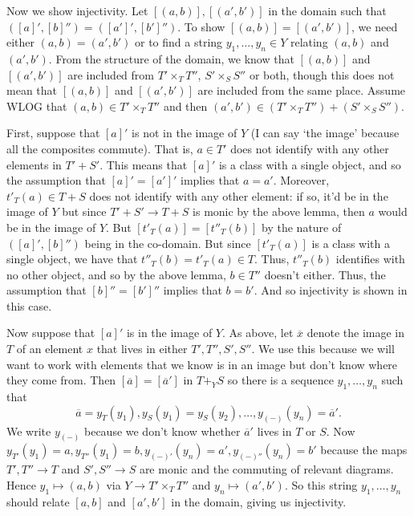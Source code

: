 \documentclass[12pt]{article}
\renewcommand{\(}{\left(}
\renewcommand{\)}{\right)}
\renewcommand{\{}{\left\lbrace}
\renewcommand{\}}{\right\rbrace}
\renewcommand{\bar}{\overline}
\theoremstyle{remark}
\theoremstyle{definition}
\begin{document}
Now we show injectivity. Let $[(a,b)],[(a',b')]$ in the domain such that $([a]',[b]'')=([a']',[b']'')$. To show $[(a,b)]=[(a',b')]$, we need either $(a,b)=(a',b')$ or to find a string $y_1, \dotsc, y_n \in Y$ relating $(a,b)$ and $(a',b')$.  From the structure of the domain, we know that $[(a,b)]$ and $[(a',b')]$ are included from $T' \times_T T''$, $S' \times_S S''$ or both, though this does not mean that $[(a,b)]$ and $[(a',b')]$ are included from the same place.  Assume WLOG that $(a,b) \in T' \times_T T''$ and then $(a',b') \in (T' \times_T T'') + (S' \times_S S'')$. 

First, suppose that $[a]'$ is not in the image of $Y$ (I can say `the image' because all the composites commute).  That is, $a \in T'$ does not identify with any other elements in $T' + S'$. This means that $[a]'$ is a class with a single object, and so the assumption that $[a]'=[a']'$ implies that $a=a'$.  Moreover, $t'_{T}(a) \in T+S$ does not identify with any other element: if so, it'd be in the image of $Y$ but since $T'+S' \to T+S$ is monic by the above lemma, then $a$ would be in the image of $Y$.  But $[t'_{T}(a)]=[t''_T(b)]$ by the nature of $([a]',[b]'')$ being in the co-domain.  But since $[t'_T(a)]$ is a class with a single object, we have that $t''_T(b)=t'_T(a) \in T$.  Thus, $t''_T(b)$ identifies with no other object, and so by the above lemma, $b \in T''$ doesn't either. Thus, the assumption that $[b]''=[b']''$ implies that $b=b'$.  And so injectivity is shown in this case.

Now suppose that $[a]'$ is in the image of $Y$.  As above, let $\bar{x}$ denote the image in $T$ of an element $x$ that lives in either $T',T'',S',S''$. We use this because we will want to work with elements that we know is in an image but don't know where they come from.  Then $[\bar{a}] = [\bar{a}']$ in $T +_Y S$ so there is a sequence $y_1, \dotsc, y_n$ such that
\[
	\bar{a} = y_T(y_1), y_S (y_1)=y_S(y_2), \dotsc, 
	y_{(-)} (y_n) = \bar{a}'.
\]
We write $y_{(-)}$ because we don't know whether $\bar{a}'$ lives in $T$ or $S$.  Now $y_{T'} (y_1) = a, y_{T''} (y_1) = b, y_{(-)'} (y_n)=a', y_{(-)''} (y_n)=b'$ because the maps $T',T'' \to T$ and $S',S'' \to S$ are monic and the commuting of relevant diagrams. Hence $y_1 \mapsto (a,b)$ via $Y \to T' \times_T T''$ and $y_n \mapsto (a',b')$. So this string $y_1, \dotsc, y_n$ should relate $[a,b]$ and $[a',b']$ in the domain, giving us injectivity. 

\end{document}
